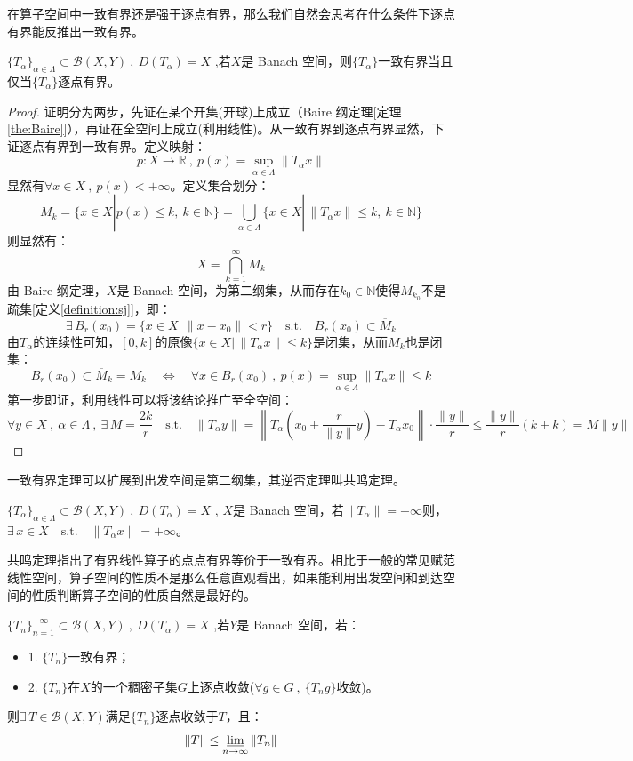 在算子空间中一致有界还是强于逐点有界，那么我们自然会思考在什么条件下逐点有界能反推出一致有界。
\begin{theorem}[一致有界定理]\label{theorem:yzyjdl}
    $\{T_{\alpha}\}_{\alpha \in \Lambda} \subset \mathscr{B}(X,Y) \ , \ D(T_{\alpha})=X$ ,若$X$是 Banach 空间，则$\{T_{\alpha}\}$一致有界当且仅当$\{T_{\alpha}\}$逐点有界。
\end{theorem} 
\begin{proof}
证明分为两步，先证在某个开集(开球)上成立（Baire 纲定理[定理\ref{the:Baire}]），再证在全空间上成立(利用线性)。从一致有界到逐点有界显然，下证逐点有界到一致有界。定义映射：
\[p:X \to \mathbb{R} \ , \ p(x)=\mathop \text{sup}\limits_{\alpha \in \Lambda}\|T_{\alpha}x\|\]
显然有$\forall x \in X \ , \ p(x)<+\infty$。定义集合划分：
\[M_k=\{x \in X|p(x) \leq k, \ k \in \mathbb{N}\}=\bigcup_{\alpha \in \Lambda}\{x \in X| \, \|T_{\alpha}x\| \leq k, \ k \in \mathbb{N}\}\]
则显然有：
\[X=\bigcap_{k=1}^{\infty}M_k\]
由 Baire 纲定理，$X$是 Banach 空间，为第二纲集，从而存在$k_0 \in \mathbb{N}$使得$M_{k_0}$不是疏集[定义\ref{definition:sj}]，即：
\[\exists \, B_r(x_0)=\{x \in X| \, \|x-x_0\|<r\} \quad \text{s.t.} \quad B_r(x_0) \subset \overline{M}_k\]
由$T_{\alpha}$的连续性可知，$[0,k]$的原像$\{x \in X| \, \|T_{\alpha}x\| \leq k\}$是闭集，从而$M_k$也是闭集：
\[B_r(x_0) \subset \overline{M}_k=M_k \quad \Leftrightarrow \quad \forall x \in B_r(x_0) \ , \ p(x)=\mathop \text{sup}\limits_{\alpha \in \Lambda}\|T_{\alpha}x\| \leq k\]
第一步即证，利用线性可以将该结论推广至全空间：
\[\forall y \in X \ , \ \alpha \in \Lambda \ , \ \exists \, M=\frac{2k}{r} \quad \text{s.t.} \quad \|T_{\alpha}y\|=\left\|T_{\alpha}\left(x_0+\frac{r}{\|y\|}y\right)-T_{\alpha}x_0\right\| \cdot \frac{\|y\|}{r} \leq \frac{\|y\|}{r}(k+k)=M\|y\|\]
\end{proof}
一致有界定理可以扩展到出发空间是第二纲集，其逆否定理叫共鸣定理。
\begin{theorem}[共鸣定理]
    $\{T_{\alpha}\}_{\alpha \in \Lambda} \subset \mathscr{B}(X,Y) \ , \ D(T_{\alpha})=X$ , $X$是 Banach 空间，若$\|T_{\alpha}\|=+\infty$则，$\exists \, x \in X \quad \text{s.t.} \quad \|T_{\alpha}x\|=+\infty$。
\end{theorem} 
共鸣定理指出了有界线性算子的点点有界等价于一致有界。相比于一般的常见赋范线性空间，算子空间的性质不是那么任意直观看出，如果能利用出发空间和到达空间的性质判断算子空间的性质自然是最好的。
\begin{theorem}\label{BS}
$\{T_n\}_{n=1}^{+\infty} \subset \mathscr{B}(X,Y) \ , \ D(T_{\alpha})=X$ ,若$Y$是 Banach 空间，若：
\begin{itemize}
    \item 1. $\{T_n\}$一致有界；
    \item 2. $\{T_n\}$在$X$的一个稠密子集$G$上逐点收敛($\forall g \in G \ , \ \{T_ng\}$收敛)。
\end{itemize}
则$\exists \, T \in \mathscr{B}(X,Y)$满足$\{T_n\}$逐点收敛于$T$，且：
\[\|T\| \leq \varliminf\limits_{n\to\infty}\|T_n\|\]
\end{theorem} 
